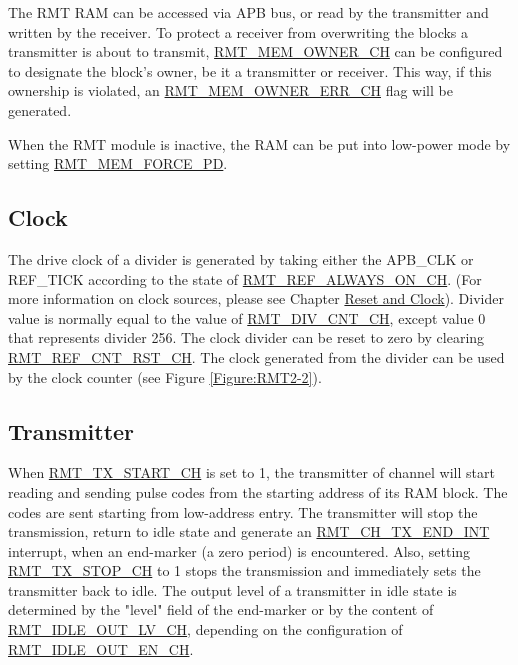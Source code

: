 \documentclass[main\_\_EN.tex]{subfiles}
\begin{document}
The RMT RAM can be accessed via APB bus, or read by the transmitter and written by the receiver. To protect a receiver from overwriting the blocks a transmitter is about to transmit, \hyperref[fielddesc:RMTREGMEMOWNERCHN]{RMT\_MEM\_OWNER\_CH} can be configured to designate the block's owner, be it a transmitter or receiver. This way, if this ownership is violated, an \hyperref[fielddesc:RMTREGMEMOWNERERRCHN]{RMT\_MEM\_OWNER\_ERR\_CH} flag will be generated.

When the RMT module is inactive, the RAM can be put into low-power mode by setting \hyperref[fielddesc:RMTREGMEMFORCEPD]{RMT\_MEM\_FORCE\_PD}.

\subsection{Clock}
The drive clock of a divider is generated by taking either the APB\_CLK or REF\_TICK according to the state of \hyperref[fielddesc:RMTREGREFALWAYSONCHN]{RMT\_REF\_ALWAYS\_ON\_CH}. (For more information on clock sources, please see Chapter \hyperref[mod:resclk]{Reset and Clock}). Divider value is normally equal to the value of \hyperref[fielddesc:RMTREGDIVCNTCHN]{RMT\_DIV\_CNT\_CH}, except value 0 that represents divider 256. The clock divider can be reset to zero by clearing \hyperref[fielddesc:RMTREGREFCNTRSTCHN]{RMT\_REF\_CNT\_RST\_CH}. The clock generated from the divider can be used by the clock counter (see Figure \ref{Figure:RMT2-2}).

\subsection{Transmitter}
When \hyperref[fielddesc:RMTREGTXSTARTCHN]{RMT\_TX\_START\_CH} is set to 1, the transmitter of channel  will start reading and sending pulse codes from the starting address of its RAM block. The codes are sent starting from low-address entry. The transmitter will stop the transmission, return to idle state and generate an \hyperref[int:RMTCHnTXENDINT]{RMT\_CH\_TX\_END\_INT} interrupt, when an end-marker (a zero period) is encountered. Also, setting \hyperref[fielddesc:RMTREGTXSTOPCHN]{RMT\_TX\_STOP\_CH} to 1 stops the transmission and immediately sets the transmitter back to idle. The output level of a transmitter in idle state is determined by the "level" field of the end-marker or by the content of \hyperref[fielddesc:RMTREGIDLEOUTLVCHN]{RMT\_IDLE\_OUT\_LV\_CH}, depending on the configuration of \hyperref[fielddesc:RMTREGIDLEOUTENCHN]{RMT\_IDLE\_OUT\_EN\_CH}.
\end{document}
